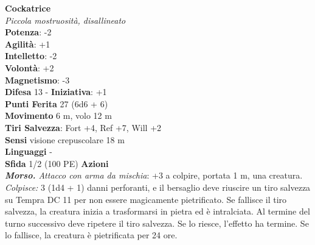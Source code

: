 \begin{multicols}{2}
\medskip\textbf{Cockatrice}\\
\emph{Piccola mostruosità, disallineato}\\
\textbf{Potenza}: -2\\
\textbf{Agilità}: +1\\
\textbf{Intelletto}: -2\\
\textbf{Volontà}: +2\\
\textbf{Magnetismo}: -3\\
\textbf{Difesa} 13 - \textbf{Iniziativa}: +1\\
\textbf{Punti Ferita} 27 (6d6 + 6)\\
\textbf{Movimento} 6 m, volo 12 m\\
\textbf{Tiri Salvezza}: Fort +4, Ref +7, Will +2\\
\textbf{Sensi} visione crepuscolare 18 m\\
\textbf{Linguaggi} -\\
\textbf{Sfida} 1/2 (100 PE)\smallskip
\smallskip\textbf{Azioni}\\
\emph{\textbf{Morso.} Attacco con arma da mischia}: +3 a colpire, portata 1 m, una creatura.\\
\emph{Colpisce:} 3 (1d4 + 1) danni perforanti, e il bersaglio deve riuscire un tiro salvezza su Tempra DC 11 per non essere magicamente pietrificato. Se fallisce il tiro salvezza, la creatura inizia a trasformarsi in pietra ed è intralciata. Al termine del turno successivo deve ripetere il tiro salvezza. Se lo riesce, l'effetto ha termine. Se lo fallisce, la creatura è pietrificata per 24 ore.\\


\end{multicols}
